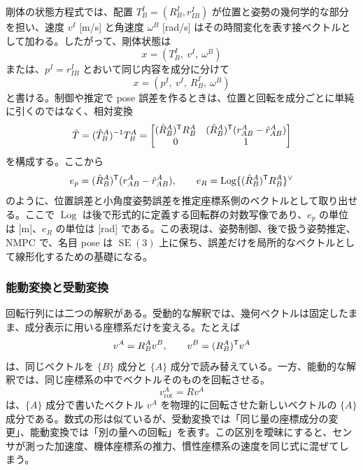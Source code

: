 剛体の状態方程式では、配置 $T^I_B=(R^I_B,r^I_{IB})$ が位置と姿勢の幾何学的な部分を担い、速度 $v^I$ [m/s] と角速度 $\omega^B$ [rad/s] はその時間変化を表す接ベクトルとして加わる。したがって、剛体状態は
\begin{equation}
  x=(T^I_B,\ v^I,\ \omega^B)
\end{equation}
または、$p^I=r^I_{IB}$ とおいて同じ内容を成分に分けて
\begin{equation}
  x=(p^I,\ v^I,\ R^I_B,\ \omega^B)
\end{equation}
と書ける。制御や推定で pose 誤差を作るときは、位置と回転を成分ごとに単純に引くのではなく、相対変換
\begin{equation}
  \tilde{T}=(\hat{T}^A_B)^{-1}T^A_B
  =
  \begin{bmatrix}
    (\hat{R}^A_B)^{\mathsf{T}} R^A_B&
    (\hat{R}^A_B)^{\mathsf{T}}(r^A_{AB}-\hat{r}^A_{AB})\\
    0&1
  \end{bmatrix}
\end{equation}
を構成する。ここから
\begin{equation}
  e_p=(\hat{R}^A_B)^{\mathsf{T}}(r^A_{AB}-\hat{r}^A_{AB}),\qquad
  e_R=\operatorname{Log}\{(\hat{R}^A_B)^{\mathsf{T}} R^A_B\}^\vee
\end{equation}
のように、位置誤差と小角度姿勢誤差を推定座標系側のベクトルとして取り出せる。ここで $\operatorname{Log}$ は後で形式的に定義する回転群の対数写像であり、$e_p$ の単位は [m]、$e_R$ の単位は [rad] である。この表現は、姿勢制御、後で扱う姿勢推定、NMPC で、名目 pose は $\operatorname{SE}(3)$ 上に保ち、誤差だけを局所的なベクトルとして線形化するための基礎になる。

\subsubsection{能動変換と受動変換}

回転行列には二つの解釈がある。受動的な解釈では、幾何ベクトルは固定したまま、成分表示に用いる座標系だけを変える。たとえば
\begin{equation}
  v^A=R^A_B v^B,
  \qquad
  v^B=(R^A_B)^{\mathsf{T}} v^A
\end{equation}
は、同じベクトルを $\{B\}$ 成分と $\{A\}$ 成分で読み替えている。一方、能動的な解釈では、同じ座標系の中でベクトルそのものを回転させる。
\begin{equation}
  v_{\mathrm{rot}}^A=R v^A
\end{equation}
は、$\{A\}$ 成分で書いたベクトル $v^A$ を物理的に回転させた新しいベクトルの $\{A\}$ 成分である。数式の形は似ているが、受動変換では「同じ量の座標成分の変更」、能動変換では「別の量への回転」を表す。この区別を曖昧にすると、センサが測った加速度、機体座標系の推力、慣性座標系の速度を同じ式に混ぜてしまう。

